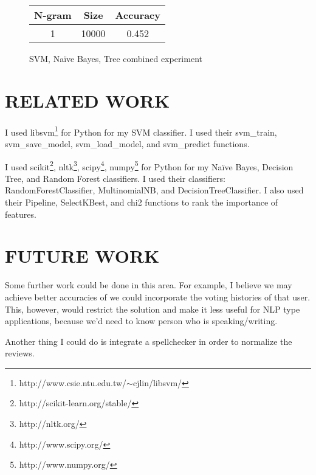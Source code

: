 \documentclass[11pt, onecolumn]{IEEEtran}
\begin{document}
\begin{figure}[H]
	\begin{center}
		\begin{tabular}{ | c | c | c |}
		\hline
		N-gram & Size & Accuracy\\
		\hline \hline
		1 & 10000 & 0.452 \\
		\hline
		\end{tabular}
	\end{center}
\caption{SVM, Na\"{i}ve Bayes, Tree combined experiment}
\label{nbresults}
\end{figure}



\section{RELATED WORK}
I used libsvm\footnote{http://www.csie.ntu.edu.tw/$\sim$cjlin/libsvm/} for Python for my SVM classifier. I used their svm\_train, svm\_save\_model, svm\_load\_model, and svm\_predict functions.

I used scikit\footnote{http://scikit-learn.org/stable/}, nltk\footnote{http://nltk.org/}, scipy\footnote{http://www.scipy.org/}, numpy\footnote{http://www.numpy.org/} for Python for my Na\"{i}ve Bayes, Decision Tree, and Random Forest classifiers. I used their classifiers: RandomForestClassifier, MultinomialNB, and DecisionTreeClassifier. I also used their Pipeline, SelectKBest, and chi2 functions to rank the importance of features.
\section{FUTURE WORK}
Some further work could be done in this area. For example, I believe we may achieve better accuracies of we could incorporate the voting histories of that user. This, however, would restrict the solution and make it less useful for NLP type applications, because we'd need to know person who is speaking/writing.

Another thing I could do is integrate a spellchecker in order to normalize the reviews.
\end{document}
